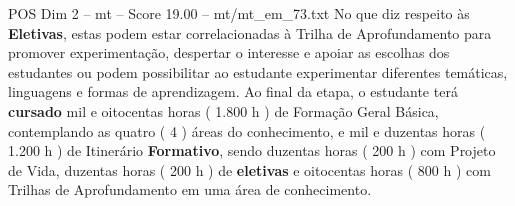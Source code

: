 \begin{textsample}{POS Dim 2 – mt – Score 19.00 – mt/mt\_em\_73.txt}
No que diz respeito às \textbf{Eletivas}, estas podem estar correlacionadas à Trilha de Aprofundamento para promover experimentação, despertar o interesse e apoiar as escolhas dos estudantes ou podem possibilitar ao estudante experimentar diferentes temáticas, linguagens e formas de aprendizagem.
Ao final da etapa, o estudante terá \textbf{cursado} mil e oitocentas horas ( 1.800 h ) de Formação Geral Básica, contemplando as quatro ( 4 ) áreas do conhecimento, e mil e duzentas horas ( 1.200 h ) de Itinerário \textbf{Formativo}, sendo duzentas horas ( 200 h ) com Projeto de Vida, duzentas horas ( 200 h ) de \textbf{eletivas} e oitocentas horas ( 800 h ) com Trilhas de Aprofundamento em uma área de conhecimento.

\end{textsample}
